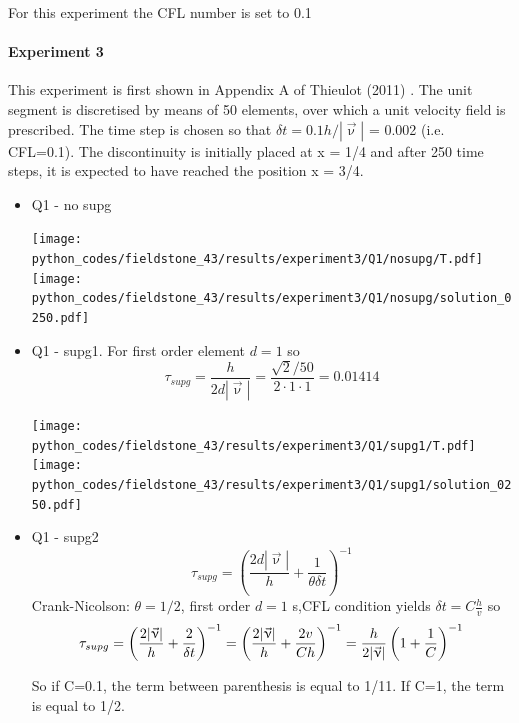 For this experiment the CFL number is set to 0.1

\newpage
\paragraph{Experiment 3}

This experiment is first shown in Appendix A of Thieulot (2011) \cite{thie11}.
The unit segment is discretised by means of 50 elements, 
over which a unit velocity field is prescribed. The time step
is chosen so that $\delta t = 0.1 h/|\vec\upnu|$ = 0.002 (i.e. CFL=0.1). 
The discontinuity is initially
placed at x = 1/4 and after 250 time steps, it is expected to have
reached the position x = 3/4.


\begin{itemize}
\item Q1 - no supg  %


\begin{center}
\texttt{[image: python\_codes/fieldstone\_43/results/experiment3/Q1/nosupg/T.pdf]}
\texttt{[image: python\_codes/fieldstone\_43/results/experiment3/Q1/nosupg/solution\_0250.pdf]}
\end{center}

\item Q1 - supg1. For first order element $d=1$ so
\[
\tau_{supg} = \frac{h}{2 d |\vec{\upnu}|} = \frac{\sqrt{2}/50}{2 \cdot 1 \cdot 1} = 0.01414
\]

\begin{center}
\texttt{[image: python\_codes/fieldstone\_43/results/experiment3/Q1/supg1/T.pdf]}
\texttt{[image: python\_codes/fieldstone\_43/results/experiment3/Q1/supg1/solution\_0250.pdf]}
\end{center}


\item Q1 - supg2 %
\[
\tau_{supg} = \left( \frac{2 d |\vec{\upnu}|}{h} + \frac{1}{\theta \delta t}  \right)^{-1}  
\]
Crank-Nicolson: $\theta=1/2$, first order $d=1$ s,CFL condition yields $\delta t = C \frac{h}{v}$ so 
\[
\tau_{supg} = \left( \frac{2 |\vec{\upnu}|}{h} + \frac{2}{\delta t}  \right)^{-1}  
= \left( \frac{2 |\vec{\upnu}|}{h} + \frac{2 v}{C h}  \right)^{-1}  
= \frac{h}{2 |\vec{\upnu}|}  \left( 1 + \frac{1}{C}  \right)^{-1} \nonumber 
\]

So if C=0.1, the term between parenthesis is equal to 1/11. If C=1, the term is equal to 1/2.


\end{itemize}
